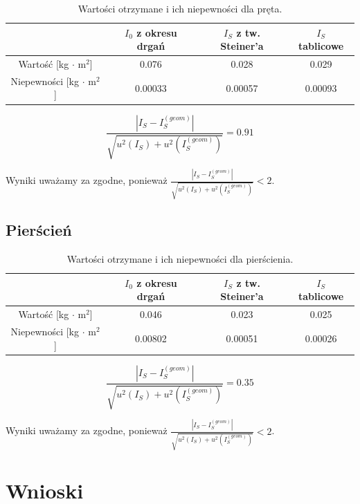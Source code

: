 \documentclass[a4paper,12pts]{article}
\begin{document}
		\begin{table}[!h]
		\centering
		\begin{tabular}{ | c | c | c | c | }
			\hline
			\textrm{ } & $I_0$ z okresu drgań & $I_S$ z tw. Steiner'a & $I_S$ tablicowe \\ \hline
			Wartość [kg $\cdot$ m$^2$] & 0.076 & 0.028 & 0.029 \\ \hline
			Niepewności [kg $\cdot$ m$^2$] & 0.00033 & 0.00057 & 0.00093 \\ \hline

		\end{tabular}
		\caption{Wartości otrzymane i ich niepewności dla pręta.}
		\label{Tabela5}	
	\end{table}

	$$\frac{|I_S - I_S^{(geom)}|}{\sqrt{u^2(I_S) + u^2(I_S^{(geom)})}} = 0.91$$
	
	Wyniki uważamy za zgodne, ponieważ $\frac{|I_S - I_S^{(geom)}|}{\sqrt{u^2(I_S) + u^2(I_S^{(geom)})}} < 2$. 
	
	\newpage
	\subsection{Pierścień}
	
	\begin{table}[!h]
		\centering
		\begin{tabular}{ | c | c | c | c | }
			\hline
			\textrm{ } & $I_0$ z okresu drgań & $I_S$ z tw. Steiner'a & $I_S$ tablicowe \\ \hline
			Wartość [kg $\cdot$ m$^2$] & 0.046 & 0.023 & 0.025 \\ \hline
			Niepewności [kg $\cdot$ m$^2$] & 0.00802 & 0.00051 & 0.00026 \\ \hline
			
		\end{tabular}
		\caption{Wartości otrzymane i ich niepewności dla pierścienia.}
		\label{Tabela6}	
	\end{table}	

	$$\frac{|I_S - I_S^{(geom)}|}{\sqrt{u^2(I_S) + u^2(I_S^{(geom)})}} = 0.35$$

	Wyniki uważamy za zgodne, ponieważ $\frac{|I_S - I_S^{(geom)}|}{\sqrt{u^2(I_S) + u^2(I_S^{(geom)})}} < 2$. 
	
	\section{Wnioski}

 
\end{document}
